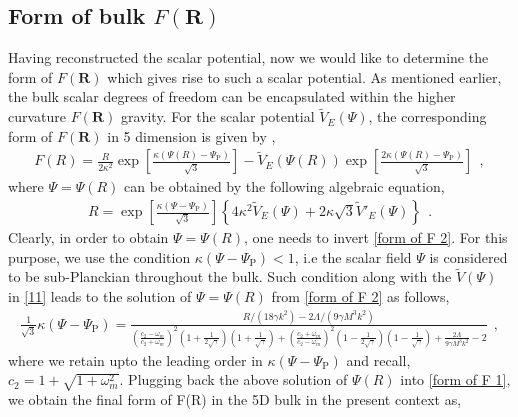 \documentclass{article}
\begin{document}
\subsection{Form of bulk $F(\mathbf{R})$}
\label{S2-3}
Having reconstructed the scalar potential, now we would like to determine the form of $F(\mathbf{R})$ which gives rise to such a scalar potential. 
As mentioned earlier, the bulk scalar degrees of freedom can be encapsulated within the higher curvature $F(\mathbf{R})$ gravity. For the scalar 
potential $\tilde{V}_E(\Psi)$, the corresponding form of $F(\mathbf{R})$ in 5 dimension is given by \cite{Nojiri:2010wj},
\begin{eqnarray}
 F(R) = \frac{R}{2\kappa^2}\exp{\left[\frac{\kappa\left(\Psi(R) - \Psi_\mathrm{P}\right)}{\sqrt{3}}\right]} - \tilde{V}_E\left(\Psi(R)\right)
 \exp{\left[\frac{2\kappa\left(\Psi(R) - \Psi_\mathrm{P}\right)}{\sqrt{3}}\right]}~~,
 \label{form of F 1}
\end{eqnarray}
where $\Psi = \Psi(R)$ can be obtained by the following algebraic equation,
\begin{eqnarray}
 R = \exp{\left[\frac{\kappa\left(\Psi - \Psi_\mathrm{P}\right)}{\sqrt{3}}\right]}\left\{4\kappa^2 \tilde{V}_E(\Psi) + 2\kappa\sqrt{3}\tilde{V}'_E(\Psi)\right\}~~.
 \label{form of F 2}
\end{eqnarray}
Clearly, in order to obtain $\Psi = \Psi(R)$, one needs to invert \ref{form of F 2}. For this purpose, we use the 
condition $\kappa(\Psi - \Psi_\mathrm{P}) < 1$, i.e the scalar field $\Psi$ is considered to be sub-Planckian throughout the bulk. 
Such condition along with the $\tilde{V}(\Psi)$ in \ref{11} leads to the solution of $\Psi = \Psi(R)$ from \ref{form of F 2} as follows,
\begin{eqnarray}
 \frac{1}{\sqrt{3}}\kappa\left(\Psi - \Psi_\mathrm{P}\right) = \frac{R/\left(18\gamma k^2\right) - 2\Lambda/\left(9\gamma M^3k^2\right)}
 {\left(\frac{c_2 - \omega_m}{c_2 + \omega_m}\right)^2\left(1 + \frac{1}{2\sqrt{\gamma}}\right)\left(1 + \frac{1}{\sqrt{\gamma}}\right) 
 + \left(\frac{c_2 + \omega_m}{c_2 - \omega_m}\right)^2\left(1 - \frac{1}{2\sqrt{\gamma}}\right)\left(1 - \frac{1}{\sqrt{\gamma}}\right) 
 + \frac{2\Lambda}{9\gamma M^3k^2} - 2}~~,
 \label{form of F 3}
\end{eqnarray}
where we retain upto the leading order in $\kappa(\Psi - \Psi_\mathrm{P})$ and recall, $c_2 = 1 + \sqrt{1 + \omega_m^2}$. 
Plugging back the above solution of $\Psi(R)$ into \ref{form of F 1}, we obtain the final form of 
F(R) in the 5D bulk in the present context as,
\end{document}
